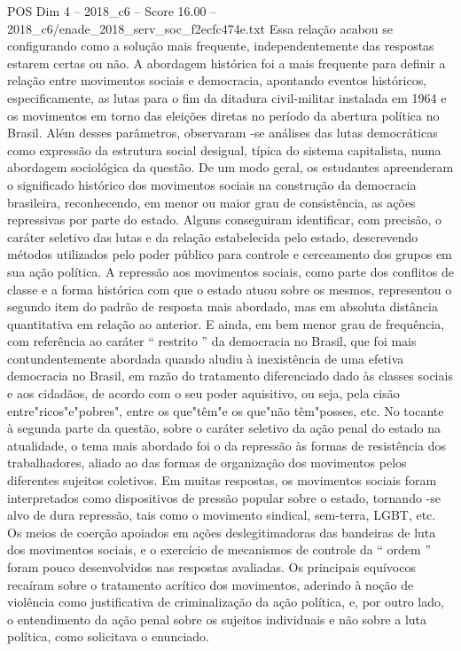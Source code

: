 \begin{textsample}{POS Dim 4 – 2018\_c6 – Score 16.00 – 2018\_c6/enade\_2018\_serv\_soc\_f2ecfc474e.txt}
Essa relação acabou se configurando como a solução mais frequente, independentemente das respostas estarem certas ou não.
A abordagem histórica foi a mais frequente para definir a relação entre movimentos sociais e democracia, apontando eventos históricos, especificamente, as lutas para o fim da ditadura civil-militar instalada em 1964 e os movimentos em torno das eleições diretas no período da abertura política no Brasil.
Além desses parâmetros, observaram -se análises das lutas democráticas como expressão da estrutura social desigual, típica do sistema capitalista, numa abordagem sociológica da questão.
De um modo geral, os estudantes apreenderam o significado histórico dos movimentos sociais na construção da democracia brasileira, reconhecendo, em menor ou maior grau de consistência, as ações repressivas por parte do estado.
Alguns conseguiram identificar, com precisão, o caráter seletivo das lutas e da relação estabelecida pelo estado, descrevendo métodos utilizados pelo poder público para controle e cerceamento dos grupos em sua ação política.
A repressão aos movimentos sociais, como parte dos conflitos de classe e a forma histórica com que o estado atuou sobre os mesmos, representou o segundo item do padrão de resposta mais abordado, mas em absoluta distância quantitativa em relação ao anterior.
E ainda, em bem menor grau de frequência, com referência ao caráter “ restrito ” da democracia no Brasil, que foi mais contundentemente abordada quando aludiu à inexistência de uma efetiva democracia no Brasil, em razão do tratamento diferenciado dado às classes sociais e aos cidadãos, de acordo com o seu poder aquisitivo, ou seja, pela cisão entre"ricos"e"pobres", entre os que"têm"e os que"não têm"posses, etc.
No tocante à segunda parte da questão, sobre o caráter seletivo da ação penal do estado na atualidade, o tema mais abordado foi o da repressão às formas de resistência dos trabalhadores, aliado ao das formas de organização dos movimentos pelos diferentes sujeitos coletivos.
Em muitas respostas, os movimentos sociais foram interpretados como dispositivos de pressão popular sobre o estado, tornando -se alvo de dura repressão, tais como o movimento sindical, sem-terra, LGBT, etc.
Os meios de coerção apoiados em ações deslegitimadoras das bandeiras de luta dos movimentos sociais, e o exercício de mecanismos de controle da “ ordem ” foram pouco desenvolvidos nas respostas avaliadas.
Os principais equívocos recaíram sobre o tratamento acrítico dos movimentos, aderindo à noção de violência como justificativa de criminalização da ação política, e, por outro lado, o entendimento da ação penal sobre os sujeitos individuais e não sobre a luta política, como solicitava o enunciado.

\end{textsample}
